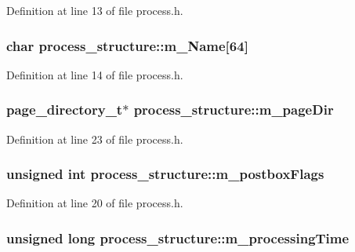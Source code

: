 Definition at line 13 of file process.h.

\hypertarget{structprocess__structure_ad48e1eeeebc30443de5b7de4a52e22c8}{
\subsubsection[{m\_\-Name}]{\setlength{\rightskip}{0pt plus 5cm}char {\bf process\_\-structure::m\_\-Name}\mbox{[}64\mbox{]}}}
\label{structprocess__structure_ad48e1eeeebc30443de5b7de4a52e22c8}


Definition at line 14 of file process.h.

\hypertarget{structprocess__structure_a696c6e2dc6799d60b208651eadbb1361}{
\subsubsection[{m\_\-pageDir}]{\setlength{\rightskip}{0pt plus 5cm}page\_\-directory\_\-t$\ast$ {\bf process\_\-structure::m\_\-pageDir}}}
\label{structprocess__structure_a696c6e2dc6799d60b208651eadbb1361}


Definition at line 23 of file process.h.

\hypertarget{structprocess__structure_aa847b634c602e55ae076b7c1eb60a12a}{
\subsubsection[{m\_\-postboxFlags}]{\setlength{\rightskip}{0pt plus 5cm}unsigned int {\bf process\_\-structure::m\_\-postboxFlags}}}
\label{structprocess__structure_aa847b634c602e55ae076b7c1eb60a12a}


Definition at line 20 of file process.h.

\hypertarget{structprocess__structure_a6f1bd4287fa411c20b741f5bd8dcdf48}{
\subsubsection[{m\_\-processingTime}]{\setlength{\rightskip}{0pt plus 5cm}unsigned long {\bf process\_\-structure::m\_\-processingTime}}}
\label{structprocess__structure_a6f1bd4287fa411c20b741f5bd8dcdf48}


